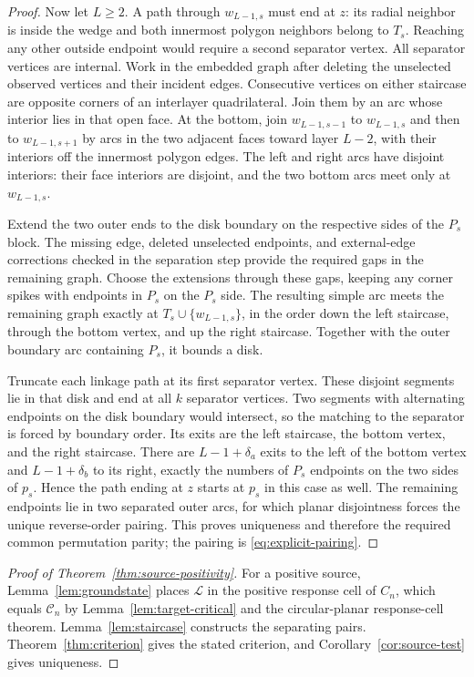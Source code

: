 \documentclass[11pt]{article}
\theoremstyle{definition}
\newcommand{\cell}{\mathcal C}
\begin{document}
\begin{proof}
Now let $L\ge2$. A path through $w_{L-1,s}$ must end at $z$:
its radial neighbor is inside the wedge and both
innermost polygon neighbors belong to $T_s$. Reaching any other
outside endpoint would require a second separator vertex.
All separator vertices are internal. Work in the embedded graph
after deleting the unselected observed vertices and their incident
edges. Consecutive vertices on either staircase are opposite corners
of an interlayer quadrilateral. Join them by an arc whose interior
lies in that open face. At the bottom, join $w_{L-1,s-1}$ to
$w_{L-1,s}$ and then to $w_{L-1,s+1}$ by arcs in the two adjacent
faces toward layer $L-2$, with their interiors off the innermost
polygon edges. The left and right arcs have disjoint interiors:
their face interiors are disjoint, and the two bottom arcs meet
only at $w_{L-1,s}$.

Extend the two outer ends to the disk boundary on the respective
sides of the $P_s$ block. The missing edge, deleted unselected
endpoints, and external-edge corrections checked in the separation
step provide the required gaps in the remaining graph. Choose the
extensions through these gaps, keeping any corner spikes with
endpoints in $P_s$ on the $P_s$ side. The resulting simple arc meets
the remaining graph exactly at $T_s\cup\{w_{L-1,s}\}$, in the
order down the left staircase, through the bottom vertex, and up
the right staircase. Together with the outer boundary arc containing
$P_s$, it bounds a disk.

Truncate each linkage path at its first separator vertex. These
disjoint segments lie in that disk and end at all $k$ separator
vertices. Two segments with alternating endpoints on the disk
boundary would intersect, so the matching to the separator is
forced by boundary order. Its exits are the left staircase, the
bottom vertex, and the right staircase. There are
$L-1+\delta_a$ exits to the left of the bottom vertex and
$L-1+\delta_b$ to its right, exactly the numbers of $P_s$
endpoints on the two sides of $p_s$. Hence the path ending at
$z$ starts at $p_s$ in this case as well. The remaining endpoints lie in two separated
outer arcs, for which planar disjointness forces the unique
reverse-order pairing. This proves uniqueness and therefore the
required common permutation parity; the pairing is
\eqref{eq:explicit-pairing}.
\end{proof}

\begin{proof}[Proof of Theorem~\ref{thm:source-positivity}]
For a positive source, Lemma~\ref{lem:groundstate} places
$\mathcal L$ in the positive response cell of $C_n$, which equals
$\cell_n$ by Lemma~\ref{lem:target-critical} and the circular-planar
response-cell theorem. Lemma~\ref{lem:staircase} constructs the
separating pairs. Theorem~\ref{thm:criterion} gives the stated
criterion, and Corollary~\ref{cor:source-test} gives uniqueness.
\end{proof}
\end{document}
